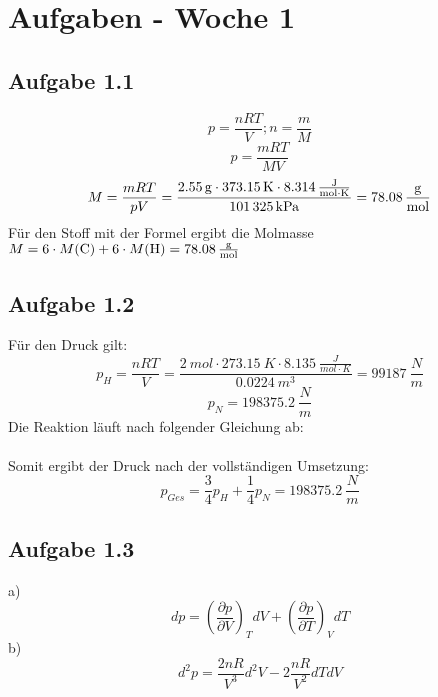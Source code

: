 \documentclass{article}
\begin{document}
\section{Aufgaben - Woche 1}
\subsection{Aufgabe 1.1}
\begin{equation*}
    p = \frac{nRT}{V}; n=\frac{m}{M}
\end{equation*}
\begin{equation*}
    p = \frac{mRT}{MV}
\end{equation*}
\begin{equation*}
    M = \frac{mRT}{pV} = \frac{\SI{2.55}{g}\cdot\SI{373.15}{K}\cdot\SI{8.314}{\frac{J}{mol\cdot K}}}{\SI{101325}{kPa}}= \SIlist{78.08}{\frac{g}{mol}}
\end{equation*}
Für den Stoff mit der Formel  ergibt die Molmasse\\$M=6\cdot M(\ce{C})+ 6\cdot M(\ce{H}) = \SI{78.08}{\frac{g}{mol}}$ 

\subsection{Aufgabe 1.2}
Für den Druck gilt:
\begin{equation*}
    p_H=\frac{nRT}{V}=\frac{\SI{2}{mol}\cdot \SI{273.15}{K} \cdot \SI{8.135}{\frac{J}{mol\cdot K}}}{\SI{0.0224}{m^3}} = \SI{99187}{\frac{N}{m}}
\end{equation*}
\begin{equation*}
    p_N=\SI{198375,2}{\frac{N}{m}}
\end{equation*}
Die Reaktion läuft nach folgender Gleichung ab:\\
\\
Somit ergibt der Druck nach der vollständigen Umsetzung:
\begin{equation*}
    p_{Ges}=\frac{3}{4}p_H + \frac{1}{4}p_N = \SI{198375,2}{\frac{N}{m}}
\end{equation*}

\subsection{Aufgabe 1.3}
a)
\begin{equation*}
    dp = \left(\frac{\partial p}{\partial V}\right)_T dV + \left(\frac{\partial p}{\partial T}\right)_V dT
\end{equation*}
b)
\begin{equation*}
    d^2p=\frac{2nR}{V^3}d^2V-2\frac{nR}{V^2}dTdV
\end{equation*}
\end{document}

